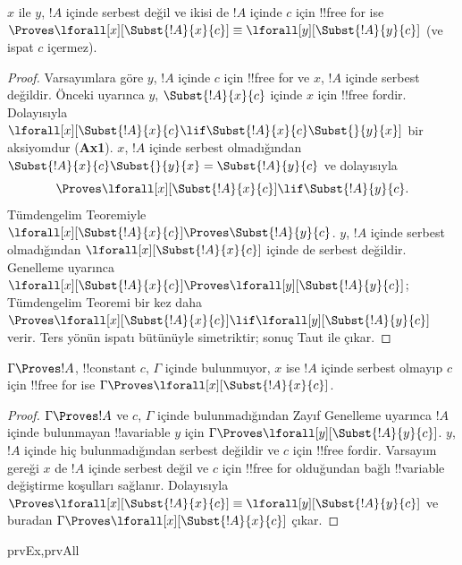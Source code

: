 \documentclass[../../../include/open-logic-section]{subfiles}
\begin{document}
\begin{lem}
$x$ ile $y$, $!A$ içinde serbest değil ve ikisi de $!A$ içinde $c$ için
!!{free for} ise
$\Proves \lforall[x][\Subst{!A}{x}{c}] \equiv
\lforall[y][\Subst{!A}{y}{c}]$ (ve ispat $c$ içermez).
\end{lem}

\begin{proof}
Varsayımlara göre $y$, $!A$ içinde $c$ için !!{free for} ve $x$, $!A$
içinde serbest değildir. Önceki  uyarınca $y$,
$\Subst{!A}{x}{c}$ içinde $x$ için !!{free for}{}dir. Dolayısıyla
$\lforall[x][\Subst{!A}{x}{c} \lif \Subst{!A}{x}{c} \Subst{}{y}{x}]$
bir aksiyomdur (\textbf{Ax1}). $x$, $!A$ içinde serbest olmadığından
$\Subst{!A}{x}{c} \Subst{}{y}{x} = \Subst{!A}{y}{c}$ ve dolayısıyla
\[
\Proves \lforall[x][\Subst{!A}{x}{c}] \lif \Subst{!A}{y}{c}.
\]
Tümdengelim Teoremiyle
$\lforall[x][\Subst{!A}{x}{c}] \Proves \Subst{!A}{y}{c}$. $y$, $!A$
içinde serbest olmadığından $\lforall[x][\Subst{!A}{x}{c}]$ içinde de
serbest değildir. Genelleme uyarınca
$\lforall[x][\Subst{!A}{x}{c}] \Proves
\lforall[y][\Subst{!A}{y}{c}]$; Tümdengelim Teoremi bir kez daha
$\Proves \lforall[x][\Subst{!A}{x}{c}] \lif
\lforall[y][\Subst{!A}{y}{c}]$ verir. Ters yönün ispatı bütünüyle
simetriktir; sonuç Taut ile çıkar.
\end{proof}

\begin{thm}
$\Gamma \Proves !A$, !!{constant} $c$, $\Gamma$ içinde bulunmuyor, $x$ ise
$!A$ içinde serbest olmayıp $c$ için !!{free for} ise
$\Gamma \Proves \lforall[x][\Subst{!A}{x}{c}]$.
\end{thm}

\begin{proof}
$\Gamma \Proves !A$ ve $c$, $\Gamma$ içinde bulunmadığından Zayıf Genelleme
uyarınca $!A$ içinde bulunmayan !!a{variable} $y$ için
$\Gamma \Proves \lforall[y][\Subst{!A}{y}{c}]$. $y$, $!A$ içinde hiç
bulunmadığından serbest değildir ve $c$ için !!{free for}{}dir. Varsayım gereği
$x$ de $!A$ içinde serbest değil ve $c$ için !!{free for} olduğundan bağlı
!!{variable} değiştirme koşulları sağlanır. Dolayısıyla
$\Proves \lforall[x][\Subst{!A}{x}{c}] \equiv
\lforall[y][\Subst{!A}{y}{c}]$ ve buradan
$\Gamma \Proves \lforall[x][\Subst{!A}{x}{c}]$ çıkar.
\end{proof}

\begin{thm}
\begin{tagenumerate}{prvEx,prvAll}
\end{tagenumerate}
\end{thm}
\end{document}
